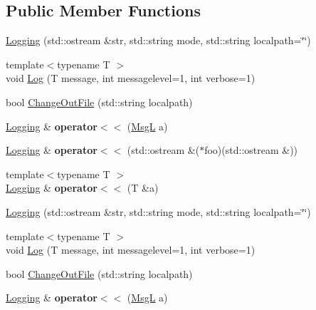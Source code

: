 \subsection*{Public Member Functions}
\begin{DoxyCompactItemize}
\item 
\hyperlink{classLogging_acdc54e0c7b62f8542ab9508b1df77aa0}{Logging} (std\-::ostream \&str, std\-::string mode, std\-::string localpath=\char`\"{}\char`\"{})
\item 
{\footnotesize template$<$typename T $>$ }\\void \hyperlink{classLogging_af7839ee68729b066da269cc012b1fcc9}{Log} (T message, int messagelevel=1, int verbose=1)
\item 
bool \hyperlink{classLogging_a7a0c89c152ad81fb41a849ed9d81e429}{Change\-Out\-File} (std\-::string localpath)
\item 
\hypertarget{classLogging_aed3d056a85b2bee70f31752595397a60}{\hyperlink{classLogging}{Logging} \& {\bfseries operator$<$$<$} (\hyperlink{structMsgL}{Msg\-L} a)}\label{classLogging_aed3d056a85b2bee70f31752595397a60}

\item 
\hypertarget{classLogging_adcbbc7dc2221a2f5fb88dc68089fb91c}{\hyperlink{classLogging}{Logging} \& {\bfseries operator$<$$<$} (std\-::ostream \&($\ast$foo)(std\-::ostream \&))}\label{classLogging_adcbbc7dc2221a2f5fb88dc68089fb91c}

\item 
\hypertarget{classLogging_a4e1557aba6b12232714eead91264587e}{{\footnotesize template$<$typename T $>$ }\\\hyperlink{classLogging}{Logging} \& {\bfseries operator$<$$<$} (T \&a)}\label{classLogging_a4e1557aba6b12232714eead91264587e}

\item 
\hyperlink{classLogging_acdc54e0c7b62f8542ab9508b1df77aa0}{Logging} (std\-::ostream \&str, std\-::string mode, std\-::string localpath=\char`\"{}\char`\"{})
\item 
{\footnotesize template$<$typename T $>$ }\\void \hyperlink{classLogging_af7839ee68729b066da269cc012b1fcc9}{Log} (T message, int messagelevel=1, int verbose=1)
\item 
bool \hyperlink{classLogging_a7a0c89c152ad81fb41a849ed9d81e429}{Change\-Out\-File} (std\-::string localpath)
\item 
\hypertarget{classLogging_aed3d056a85b2bee70f31752595397a60}{\hyperlink{classLogging}{Logging} \& {\bfseries operator$<$$<$} (\hyperlink{structMsgL}{Msg\-L} a)}\label{classLogging_aed3d056a85b2bee70f31752595397a60}


\end{DoxyCompactItemize}
